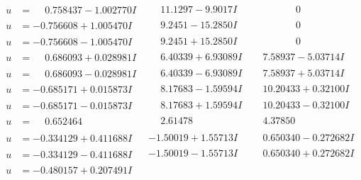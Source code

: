 \documentclass[1p]{elsarticle_modified}
\theoremstyle{definition}
\begin{document}
$$\begin{array}{c|c|c}
\begin{aligned}
u &= \phantom{-}0.758437 - 1.002770 I\end{aligned}
 & \phantom{-}11.1297 - 9.9017 I & \phantom{-0.000000 } 0 \\ \hline\begin{aligned}
u &= -0.756608 + 1.005470 I\end{aligned}
 & \phantom{-}9.2451 - 15.2850 I & \phantom{-0.000000 } 0 \\ \hline\begin{aligned}
u &= -0.756608 - 1.005470 I\end{aligned}
 & \phantom{-}9.2451 + 15.2850 I & \phantom{-0.000000 } 0 \\ \hline\begin{aligned}
u &= \phantom{-}0.686093 + 0.028981 I\end{aligned}
 & \phantom{-}6.40339 + 6.93089 I & \phantom{-}7.58937 - 5.03714 I \\ \hline\begin{aligned}
u &= \phantom{-}0.686093 - 0.028981 I\end{aligned}
 & \phantom{-}6.40339 - 6.93089 I & \phantom{-}7.58937 + 5.03714 I \\ \hline\begin{aligned}
u &= -0.685171 + 0.015873 I\end{aligned}
 & \phantom{-}8.17683 - 1.59594 I & \phantom{-}10.20433 + 0.32100 I \\ \hline\begin{aligned}
u &= -0.685171 - 0.015873 I\end{aligned}
 & \phantom{-}8.17683 + 1.59594 I & \phantom{-}10.20433 - 0.32100 I \\ \hline\begin{aligned}
u &= \phantom{-}0.652464\phantom{ +0.000000I}\end{aligned}
 & \phantom{-}2.61478\phantom{ +0.000000I} & \phantom{-}4.37850\phantom{ +0.000000I} \\ \hline\begin{aligned}
u &= -0.334129 + 0.411688 I\end{aligned}
 & -1.50019 + 1.55713 I & \phantom{-}0.650340 - 0.272682 I \\ \hline\begin{aligned}
u &= -0.334129 - 0.411688 I\end{aligned}
 & -1.50019 - 1.55713 I & \phantom{-}0.650340 + 0.272682 I \\ \hline\begin{aligned}
u &= -0.480157 + 0.207491 I\end{aligned}

\end{array}$$
\end{document}
